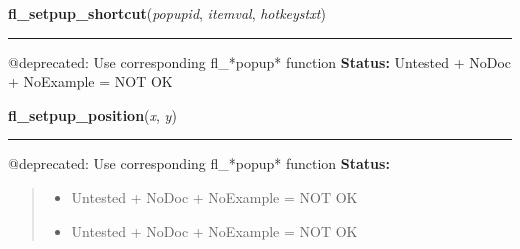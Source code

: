     \vspace{0.5ex}

\hspace{.8\funcindent}\begin{boxedminipage}{\funcwidth}

    \raggedright \textbf{fl\_setpup\_shortcut}(\textit{popupid}, \textit{itemval}, \textit{hotkeystxt})

    \vspace{-1.5ex}

    \rule{\textwidth}{0.5\fboxrule}
\setlength{\parskip}{2ex}

@deprecated: Use corresponding fl\_*popup* function
\setlength{\parskip}{1ex}
\textbf{Status:} 
Untested + NoDoc + NoExample = NOT OK


    \end{boxedminipage}

    \label{xformslib:deprecated:fl_setpup_position}

    \vspace{0.5ex}

\hspace{.8\funcindent}\begin{boxedminipage}{\funcwidth}

    \raggedright \textbf{fl\_setpup\_position}(\textit{x}, \textit{y})

    \vspace{-1.5ex}

    \rule{\textwidth}{0.5\fboxrule}
\setlength{\parskip}{2ex}

@deprecated: Use corresponding fl\_*popup* function
\setlength{\parskip}{1ex}
\textbf{Status:}
\begin{quote}
  \begin{itemize}

  \item
    \setlength{\parskip}{0.6ex}

Untested + NoDoc + NoExample = NOT OK


  \item 
Untested + NoDoc + NoExample = NOT OK


\end{itemize}

\end{quote}

    \end{boxedminipage}

